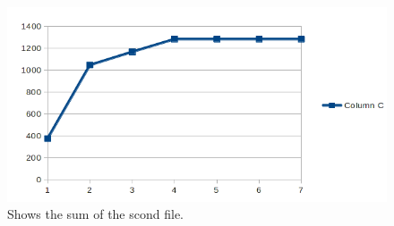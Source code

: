 \documentclass[12pt, a4paper]{article}
\begin{document}
\begin{figure}[htb]
    \centering
    \includegraphics[width=\textwidth]{sum2}
    \caption{Shows the sum of the scond file.}
    \label{fig:8}
\end{figure}
\end{document}
